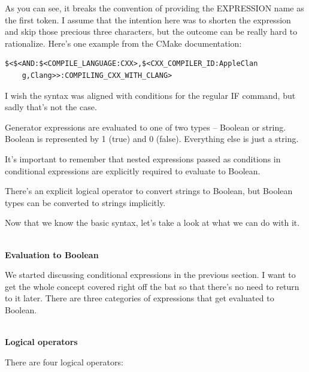 As you can see, it breaks the convention of providing the EXPRESSION name as the first token. I assume that the intention here was to shorten the expression and skip those precious three characters, but the outcome can be really hard to rationalize. Here's one example from the CMake documentation:

\begin{lstlisting}[style=styleCMake]
$<$<AND:$<COMPILE_LANGUAGE:CXX>,$<CXX_COMPILER_ID:AppleClan
	g,Clang>>:COMPILING_CXX_WITH_CLANG>
\end{lstlisting}

I wish the syntax was aligned with conditions for the regular IF command, but sadly that's not the case.


Generator expressions are evaluated to one of two types – Boolean or string. Boolean is represented by 1 (true) and 0 (false). Everything else is just a string.

It's important to remember that nested expressions passed as conditions in conditional expressions are explicitly required to evaluate to Boolean.

There's an explicit logical operator to convert strings to Boolean, but Boolean types can be converted to strings implicitly.

Now that we know the basic syntax, let's take a look at what we can do with it.

\hspace*{\fill} \\ %
\noindent
\textbf{Evaluation to Boolean}

We started discussing conditional expressions in the previous section. I want to get the whole concept covered right off the bat so that there's no need to return to it later. There are three categories of expressions that get evaluated to Boolean.

\hspace*{\fill} \\ %
\noindent
\textbf{Logical operators}

There are four logical operators:

